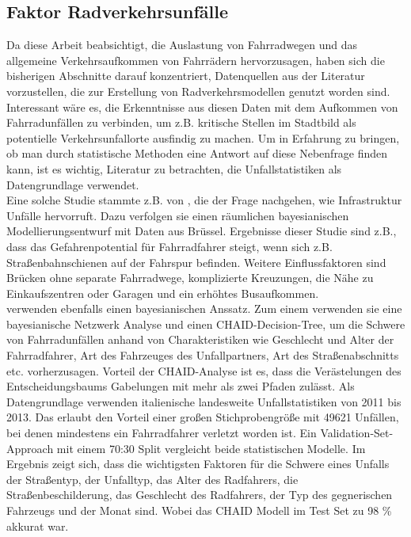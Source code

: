 \documentclass[a4paper,12pt]{thesis}
\begin{document}
\subsection{Faktor Radverkehrsunfälle}

Da diese Arbeit beabsichtigt, die Auslastung von Fahrradwegen und das allgemeine Verkehrsaufkommen von Fahrrädern hervorzusagen, haben sich die bisherigen Abschnitte darauf konzentriert, Datenquellen aus der Literatur vorzustellen, die zur Erstellung von Radverkehrsmodellen genutzt worden sind. Interessant wäre es, die Erkenntnisse aus diesen Daten mit dem Aufkommen von Fahrradunfällen zu verbinden, um z.B. kritische Stellen im Stadtbild als potentielle Verkehrsunfallorte ausfindig zu machen. Um in Erfahrung zu bringen, ob man durch statistische Methoden eine Antwort auf diese Nebenfrage finden kann, ist es wichtig, Literatur zu betrachten, die Unfallstatistiken als Datengrundlage verwendet.\\
Eine solche Studie stammte z.B. von \cite{Vandenbulcke2014}, die der Frage nachgehen, wie Infrastruktur Unfälle hervorruft. Dazu verfolgen sie einen räumlichen bayesianischen Modellierungsentwurf mit Daten aus Brüssel. Ergebnisse dieser Studie sind z.B., dass das Gefahrenpotential für Fahrradfahrer steigt, wenn sich z.B. Straßenbahnschienen auf der Fahrspur befinden. Weitere Einflussfaktoren sind Brücken ohne separate Fahrradwege, komplizierte Kreuzungen, die Nähe zu Einkaufszentren oder Garagen und ein erhöhtes Busaufkommen.\\
\cite{PRATI201744} verwenden ebenfalls einen bayesianischen Anssatz. Zum einem verwenden sie eine bayesianische Netzwerk Analyse und einen CHAID-Decision-Tree, um die Schwere von Fahrradunfällen anhand von Charakteristiken wie Geschlecht und Alter der Fahrradfahrer, Art des Fahrzeuges des Unfallpartners, Art des Straßenabschnitts etc. vorherzusagen. Vorteil der CHAID-Analyse ist es, dass die Verästelungen des Entscheidungsbaums Gabelungen mit mehr als zwei Pfaden zulässt. Als Datengrundlage verwenden \cite{PRATI201744} italienische landesweite Unfallstatistiken von 2011 bis 2013. Das erlaubt den Vorteil einer großen Stichprobengröße mit 49621 Unfällen, bei denen mindestens ein Fahrradfahrer verletzt worden ist. Ein Validation-Set-Approach mit einem 70:30 Split vergleicht beide statistischen Modelle. Im Ergebnis zeigt sich, dass die wichtigsten Faktoren für die Schwere eines Unfalls der Straßentyp, der Unfalltyp, das Alter des Radfahrers, die Straßenbeschilderung, das Geschlecht des Radfahrers, der Typ des gegnerischen Fahrzeugs und der Monat sind. Wobei das CHAID Modell im Test Set zu 98 \% akkurat war.\\
\end{document}
